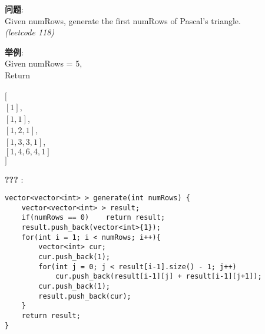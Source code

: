     
\begin{description}
    \item{\textbf{问题}}:\\
Given numRows, generate the first numRows of Pascal's triangle. \\
\textit{(leetcode 118)}
    \item{\textbf{举例}}:\\
Given numRows = 5, \\
Return \\
\\
$[$ \\
     $[1]$, \\
    $[1,1]$, \\
   $[1,2,1]$, \\
  $[1,3,3,1]$, \\
 $[1,4,6,4,1]$ \\
$]$
    \item{\textbf{???}} : 
    \begin{lstlisting}
vector<vector<int> > generate(int numRows) {
	vector<vector<int> > result;
	if(numRows == 0)	return result;
	result.push_back(vector<int>{1});
	for(int i = 1; i < numRows; i++){
		vector<int> cur;
		cur.push_back(1);
		for(int j = 0; j < result[i-1].size() - 1; j++)
			cur.push_back(result[i-1][j] + result[i-1][j+1]);
		cur.push_back(1);
		result.push_back(cur);
	}
	return result;
}
    \end{lstlisting}
\end{description}
